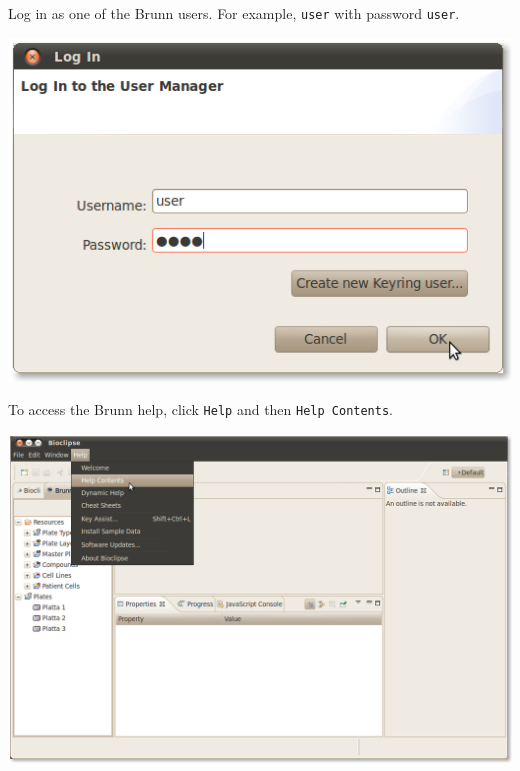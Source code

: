 \documentclass[12pt, a4paper, twoside, openany]{article}
\begin{document}
    Log in as one of the Brunn users. For example, \texttt{user} with password
    \texttt{user}.

    \begin{center}
        \includegraphics[scale=1.2]{images/2.png}
    \end{center}

    \newpage

    To access the Brunn help, click \texttt{Help} and then \texttt{Help
    Contents}.

    \begin{center}
        \includegraphics[scale=1.2]{images/5.png}
    \end{center}
\end{document}
